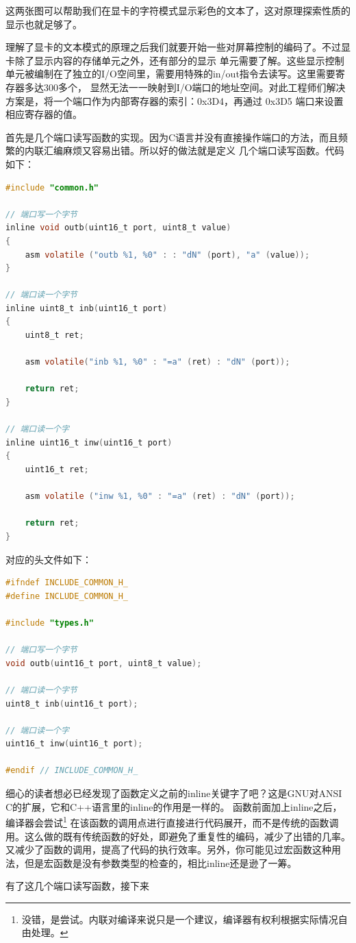 \par 这两张图可以帮助我们在显卡的字符模式显示彩色的文本了，这对原理探索性质的显示也就足够了。

\par 理解了显卡的文本模式的原理之后我们就要开始一些对屏幕控制的编码了。不过显卡除了显示内容的存储单元之外，还有部分的显示\allowbreak
单元需要了解。这些显示控制单元被编制在了独立的I/O空间里，需要用特殊的in/out指令去读写。这里需要寄存器多达300多个，\allowbreak
显然无法一一映射到I/O端口的地址空间。对此工程师们解决方案是，将一个端口作为内部寄存器的索引：0x3D4，再通过 0x3D5\allowbreak
端口来设置相应寄存器的值。

\par 首先是几个端口读写函数的实现。因为C语言并没有直接操作端口的方法，而且频繁的内联汇编麻烦又容易出错。所以好的做法就是定义\allowbreak
几个端口读写函数。代码如下：

\begin{lstlisting}[language = C, label = libs/common.c, caption = libs/common.c]
#include "common.h"

// 端口写一个字节
inline void outb(uint16_t port, uint8_t value)
{
	asm volatile ("outb %1, %0" : : "dN" (port), "a" (value));
}

// 端口读一个字节
inline uint8_t inb(uint16_t port)
{
	uint8_t ret;

	asm volatile("inb %1, %0" : "=a" (ret) : "dN" (port));

	return ret;
}

// 端口读一个字
inline uint16_t inw(uint16_t port)
{
	uint16_t ret;

	asm volatile ("inw %1, %0" : "=a" (ret) : "dN" (port));

	return ret;
}
\end{lstlisting}

\par 对应的头文件如下：
\begin{lstlisting}[language = C, label = include/common.h, caption = include/common.h]
#ifndef INCLUDE_COMMON_H_
#define INCLUDE_COMMON_H_

#include "types.h"

// 端口写一个字节
void outb(uint16_t port, uint8_t value);

// 端口读一个字节
uint8_t inb(uint16_t port);

// 端口读一个字
uint16_t inw(uint16_t port);

#endif // INCLUDE_COMMON_H_
\end{lstlisting}

\par 细心的读者想必已经发现了函数定义之前的inline关键字了吧？这是GNU对ANSI C的扩展，它和C++语言里的inline的作用是一样的。\allowbreak
函数前面加上inline之后，编译器会尝试\footnote{没错，是尝试。内联对编译来说只是一个建议，编译器有权利根据实际情况自由处理。}\allowbreak
在该函数的调用点进行直接进行代码展开，而不是传统的函数调用。这么做的既有传统函数的好处，即避免了重复性的编码，减少了出错的几率。\allowbreak
又减少了函数的调用，提高了代码的执行效率。另外，你可能见过宏函数这种用法，但是宏函数是没有参数类型的检查的，相比inline还是逊了一筹。

\par 有了这几个端口读写函数，接下来



